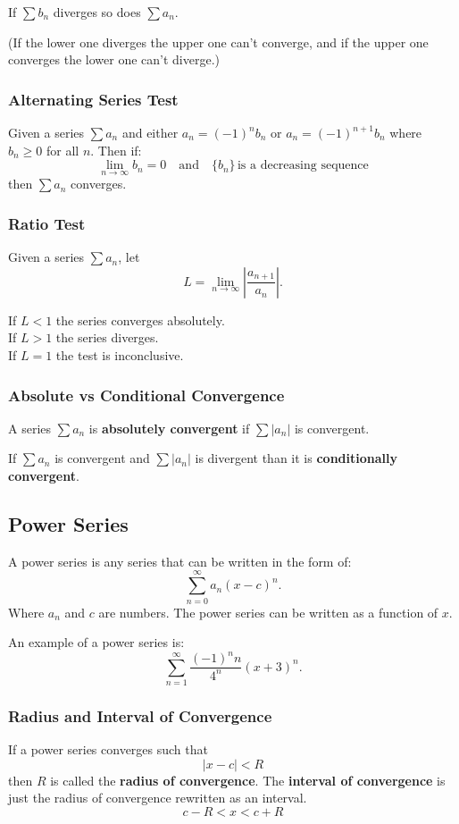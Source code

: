 \documentclass[12pt]{article}
\begin{document}
\noindent If $\displaystyle \sum b_n$ diverges so does $\displaystyle \sum a_n$.

\noindent (If the lower one diverges the upper one can't converge, and if the upper one converges the lower one can't diverge.)

\subsubsection{Alternating Series Test}
Given a series $\displaystyle \sum a_n$ and either $a_n = (-1)^n b_n$ or $a_n = (-1)^{n+1} b_n$ where $b_n \ge 0$ for all $n$. Then if:
\[ \lim_{n \to \infty} b_n = 0 \quad \text{and} \quad \{b_n\} \, \text{is a decreasing sequence} \]
then $\displaystyle \sum a_n$ converges.

\subsubsection{Ratio Test}
\noindent Given a series $\displaystyle \sum a_n$, let
\[ L = \lim_{n \to \infty} \left| \frac{a_{n+1}}{a_n} \right|. \]

\noindent If $L < 1$ the series converges absolutely.
\\ If $L > 1$ the series diverges.
\\ If $L = 1$ the test is inconclusive.

\subsubsection{Absolute vs Conditional Convergence}
\noindent A series $\displaystyle \sum a_n$ is \textbf{absolutely convergent} if $\displaystyle \sum |a_n|$ is convergent.

\noindent If $\displaystyle \sum a_n$ is convergent and $\displaystyle \sum |a_n|$ is divergent than it is \textbf{conditionally convergent}.

\subsection{Power Series}
A power series is any series that can be written in the form of:
\[ \sum_{n=0}^\infty a_n (x-c)^n. \]
Where $a_n$ and $c$ are numbers. The power series can be written as a function of $x$.

\noindent An example of a power series is:
\[ \sum_{n=1}^\infty \frac{(-1)^n n}{4^n} (x+3)^n. \]

\subsubsection{Radius and Interval of Convergence}
\noindent If a power series converges such that
\[ |x-c| < R \]
then $R$ is called the \textbf{radius of convergence}. The \textbf{interval of convergence} is just the radius of convergence rewritten as an interval.
\[ c - R < x < c + R \]
\end{document}
